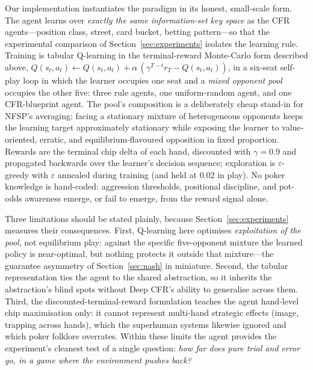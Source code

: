 Our implementation instantiates the paradigm in its honest, small-scale form. The agent learns over \emph{exactly the same information-set key space} as the CFR agents---position class, street, card bucket, betting pattern---so that the experimental comparison of Section~\ref{sec:experiments} isolates the learning rule. Training is tabular Q-learning in the terminal-reward Monte-Carlo form described above, $Q(s_t,a_t) \leftarrow Q(s_t,a_t) + \alpha\,(\gamma^{T-t} r_T - Q(s_t,a_t))$, in a six-seat self-play loop in which the learner occupies one seat and a \emph{mixed opponent pool} occupies the other five: three rule agents, one uniform-random agent, and one CFR-blueprint agent. The pool's composition is a deliberately cheap stand-in for NFSP's averaging: facing a stationary mixture of heterogeneous opponents keeps the learning target approximately stationary while exposing the learner to value-oriented, erratic, and equilibrium-flavoured opposition in fixed proportion. Rewards are the terminal chip delta of each hand, discounted with $\gamma = 0.9$ and propagated backwards over the learner's decision sequence; exploration is $\varepsilon$-greedy with $\varepsilon$ annealed during training (and held at $0.02$ in play). No poker knowledge is hand-coded: aggression thresholds, positional discipline, and pot-odds awareness emerge, or fail to emerge, from the reward signal alone.

Three limitations should be stated plainly, because Section~\ref{sec:experiments} measures their consequences. First, Q-learning here optimises \emph{exploitation of the pool}, not equilibrium play: against the specific five-opponent mixture the learned policy is near-optimal, but nothing protects it outside that mixture---the guarantee asymmetry of Section~\ref{sec:nash} in miniature. Second, the tabular representation ties the agent to the shared abstraction, so it inherits the abstraction's blind spots without Deep CFR's ability to generalise across them. Third, the discounted-terminal-reward formulation teaches the agent hand-level chip maximisation only: it cannot represent multi-hand strategic effects (image, trapping across hands), which the superhuman systems likewise ignored and which poker folklore overrates. Within these limits the agent provides the experiment's cleanest test of a single question: \emph{how far does pure trial and error go, in a game where the environment pushes back?}
